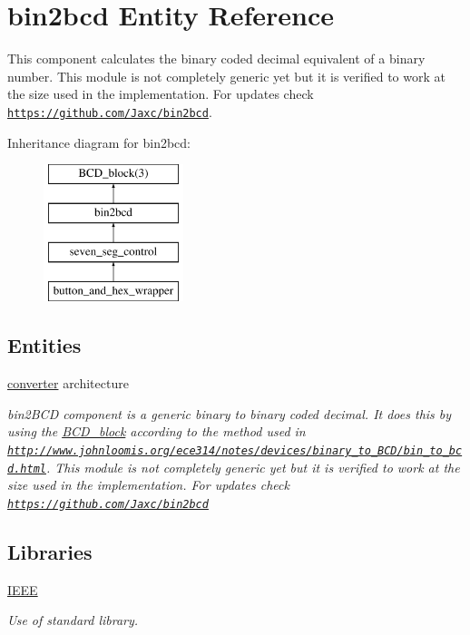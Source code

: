 \hypertarget{classbin2bcd}{\section{bin2bcd Entity Reference}
\label{classbin2bcd}
}


This component calculates the binary coded decimal equivalent of a binary number. This module is not completely generic yet but it is verified to work at the size used in the implementation. For updates check \href{https://github.com/Jaxc/bin2bcd}{\tt https\-://github.\-com/\-Jaxc/bin2bcd}.  


Inheritance diagram for bin2bcd\-:\begin{figure}[H]
\begin{center}
\leavevmode
\includegraphics[height=4.000000cm]{classbin2bcd}
\end{center}
\end{figure}
\subsection*{Entities}
\begin{DoxyCompactItemize}
\item 
\hyperlink{classbin2bcd_1_1converter}{converter} architecture
\begin{DoxyCompactList}\small\item\em bin2\-B\-C\-D  component is a generic binary to binary coded decimal. It does this by using the \hyperlink{classBCD__block}{B\-C\-D\-\_\-block} according to the method used in \href{http://www.johnloomis.org/ece314/notes/devices/binary_to_BCD/bin_to_bcd.html}{\tt http\-://www.\-johnloomis.\-org/ece314/notes/devices/binary\-\_\-to\-\_\-\-B\-C\-D/bin\-\_\-to\-\_\-bcd.\-html}. This module is not completely generic yet but it is verified to work at the size used in the implementation. For updates check \href{https://github.com/Jaxc/bin2bcd}{\tt https\-://github.\-com/\-Jaxc/bin2bcd} \end{DoxyCompactList}\end{DoxyCompactItemize}
\subsection*{Libraries}
 \begin{DoxyCompactItemize}
\item 
\hypertarget{classbin2bcd_ae4f03c286607f3181e16b9aa12d0c6d4}{\hyperlink{classbin2bcd_ae4f03c286607f3181e16b9aa12d0c6d4}{I\-E\-E\-E} }\label{classbin2bcd_ae4f03c286607f3181e16b9aa12d0c6d4}

\begin{DoxyCompactList}\small\item\em Use of standard library. \end{DoxyCompactList}\end{DoxyCompactItemize}

